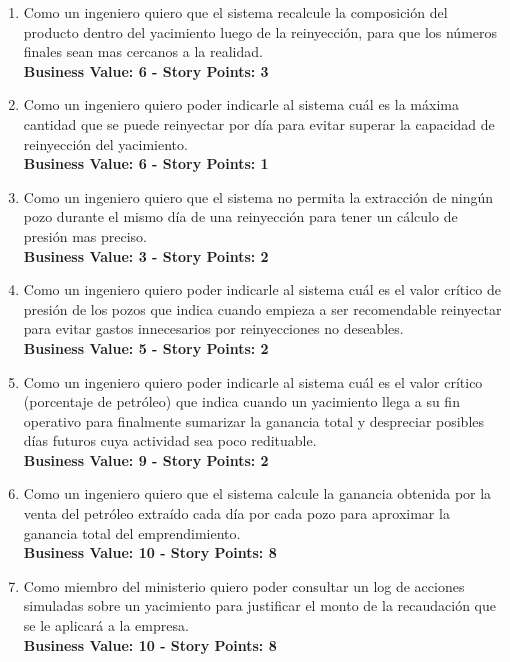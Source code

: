 \begin{enumerate}
  \item Como un ingeniero quiero que el sistema recalcule la composición del producto dentro del yacimiento luego de la reinyección, para que los números finales sean mas cercanos a la realidad.\\
  \textbf{Business Value: 6 - Story Points: 3}
  
  \item Como un ingeniero quiero poder indicarle al sistema cuál es la máxima cantidad que se puede reinyectar por día para evitar superar la capacidad de reinyección del yacimiento.\\
  \textbf{Business Value: 6 - Story Points: 1}
  
  \item Como un ingeniero quiero que el sistema no permita la extracción de ningún pozo durante el mismo día de una reinyección para tener un cálculo de presión mas preciso.\\
  \textbf{Business Value: 3 - Story Points: 2}
  
  \item Como un ingeniero quiero poder indicarle al sistema cuál es el valor crítico de presión de los pozos que indica cuando empieza a ser recomendable reinyectar para evitar gastos innecesarios por reinyecciones no deseables.\\
  \textbf{Business Value: 5 - Story Points: 2}
  
  \item Como un ingeniero quiero poder indicarle al sistema cuál es el valor crítico (porcentaje de petróleo) que indica cuando un yacimiento llega a su fin operativo para finalmente sumarizar la ganancia total y despreciar posibles días futuros cuya actividad sea poco redituable.\\
  \textbf{Business Value: 9 - Story Points: 2}
  
  \item Como un ingeniero quiero que el sistema calcule la ganancia obtenida por la venta del petróleo extraído cada día por cada pozo para aproximar la ganancia total del emprendimiento.\\
  \textbf{Business Value: 10 - Story Points: 8}
  
  \item Como miembro del ministerio quiero poder consultar un log de acciones simuladas sobre un yacimiento para justificar el monto de la recaudación que se le aplicará a la empresa.\\
  \textbf{Business Value: 10 - Story Points: 8} 
 

\end{enumerate}
